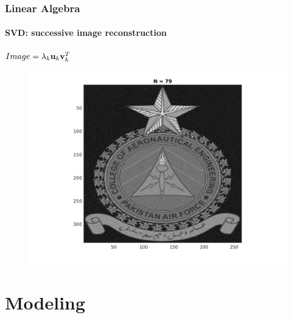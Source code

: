 \documentclass[hyperref={pdfpagelabels=true}]{beamer}
\begin{document}
\begin{frame}
\frametitle{Linear Algebra}
\framesubtitle{SVD: successive image reconstruction} 
\small{
\begin{center}
$Image = \lambda_k{\bf u}_k {\bf v}_k^T$
\end{center}}
\begin{figure}[!htb]
\centering
\includegraphics [scale=0.48]{n/b79.png}
\end{figure}
\end{frame}





\section{Modeling}
\end{document}
